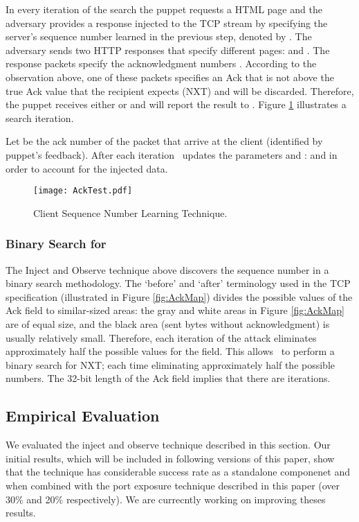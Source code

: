 \documentclass[conference]{IEEEtran}
\begin{document}
In every iteration of the search the puppet requests a HTML page and the adversary provides a response injected to the TCP stream by specifying the server's sequence number learned in the previous step, denoted by . The adversary sends two HTTP responses that specify different pages:  and . The response packets specify the acknowledgment numbers . According to the observation above, one of these packets specifies an Ack that is not above the true Ack value that the recipient expects (NXT) and will be discarded. Therefore, the puppet receives either  or  and will report the result to \mal. Figure \ref{fig:AckTest} illustrates a search iteration.

Let  be the ack number of the packet that arrive at the client (identified by puppet's feedback). After each iteration \mal\ updates the parameters  and :  and  in order to account for the injected data.

\begin{figure}
	\centering
		\texttt{[image: AckTest.pdf]}
	\caption{Client Sequence Number Learning Technique.}
	\label{fig:AckTest}
\end{figure}



\subsubsection{Binary Search for } \label{Injection:SimpleBinary}

The Inject and Observe technique above discovers the sequence number in a binary search methodology. The `before' and `after' terminology used in the TCP specification (illustrated in Figure \ref{fig:AckMap}) divides the possible values of the Ack field to similar-sized areas: the gray and white areas in Figure \ref{fig:AckMap} are of equal size, and the black area (sent bytes without acknowledgment) is usually relatively small. Therefore, each iteration of the attack eliminates approximately half the possible values for the field. This allows \mal\ to perform a binary search for NXT; each time eliminating approximately half the possible numbers. The 32-bit length of the Ack field implies that there are  iterations.


\subsection{Empirical Evaluation}
We evaluated the inject and observe technique described in this section. Our initial results, which will be included in following versions of this paper, show that the technique has considerable success rate as a standalone componenet and when combined with the port exposure technique described in this paper (over 30\% and 20\% respectively). We are currecntly working on improving theses results.
\end{document}
